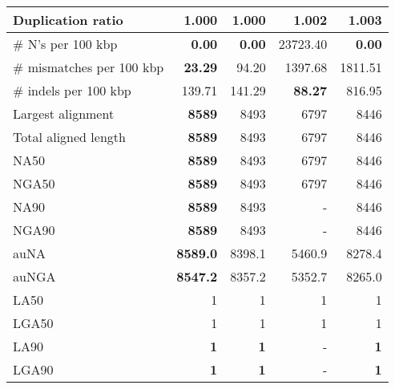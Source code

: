\documentclass[12pt,a4paper]{article}
\begin{document}
\begin{table}[ht]
\begin{center}
\begin{tabular}{|l*{4}{|r}|}
Duplication ratio & {\bf 1.000} & {\bf 1.000} & 1.002 & 1.003 \\ \hline
\# N's per 100 kbp & {\bf 0.00} & {\bf 0.00} & 23723.40 & {\bf 0.00} \\ \hline
\# mismatches per 100 kbp & {\bf 23.29} & 94.20 & 1397.68 & 1811.51 \\ \hline
\# indels per 100 kbp & 139.71 & 141.29 & {\bf 88.27} & 816.95 \\ \hline
Largest alignment & {\bf 8589} & 8493 & 6797 & 8446 \\ \hline
Total aligned length & {\bf 8589} & 8493 & 6797 & 8446 \\ \hline
NA50 & {\bf 8589} & 8493 & 6797 & 8446 \\ \hline
NGA50 & {\bf 8589} & 8493 & 6797 & 8446 \\ \hline
NA90 & {\bf 8589} & 8493 & - & 8446 \\ \hline
NGA90 & {\bf 8589} & 8493 & - & 8446 \\ \hline
auNA & {\bf 8589.0} & 8398.1 & 5460.9 & 8278.4 \\ \hline
auNGA & {\bf 8547.2} & 8357.2 & 5352.7 & 8265.0 \\ \hline
LA50 & 1 & 1 & 1 & 1 \\ \hline
LGA50 & 1 & 1 & 1 & 1 \\ \hline
LA90 & {\bf 1} & {\bf 1} & - & {\bf 1} \\ \hline
LGA90 & {\bf 1} & {\bf 1} & - & {\bf 1} \\ \hline
\end{tabular}
\end{center}
\end{table}
\end{document}
